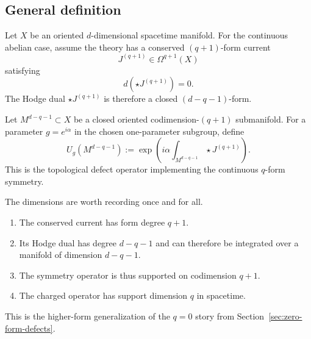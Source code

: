 \subsection{General definition}

\begin{assumption}\label{ass:qform-standing}
Let $X$ be an oriented $d$-dimensional spacetime manifold. For the continuous abelian case, assume the theory has a conserved $(q+1)$-form current
\begin{equation*}
J^{(q+1)}\in \Omega^{q+1}(X)
\end{equation*}
satisfying
\begin{equation}\label{eq:qform-conservation}
d(\star J^{(q+1)})=0.
\end{equation}
The Hodge dual $\star J^{(q+1)}$ is therefore a closed $(d-q-1)$-form.
\end{assumption}

\begin{definition}\label{def:qform-defect}
Let $M^{d-q-1}\subset X$ be a closed oriented codimension-$(q+1)$ submanifold. For a parameter $g=e^{i\alpha}$ in the chosen one-parameter subgroup, define
\begin{equation}\label{eq:Uq-general}
U_g(M^{d-q-1})
:=
\exp\!\left(i\alpha\int_{M^{d-q-1}}\star J^{(q+1)}\right).
\end{equation}
This is the topological defect operator implementing the continuous $q$-form symmetry.
\end{definition}

\begin{remark}\label{rem:qform-dimensions}
The dimensions are worth recording once and for all.
\begin{enumerate}
\item The conserved current has form degree $q+1$.
\item Its Hodge dual has degree $d-q-1$ and can therefore be integrated over a manifold of dimension $d-q-1$.
\item The symmetry operator is thus supported on codimension $q+1$.
\item The charged operator has support dimension $q$ in spacetime.
\end{enumerate}
This is the higher-form generalization of the $q=0$ story from Section~\ref{sec:zero-form-defects}.
\end{remark}

